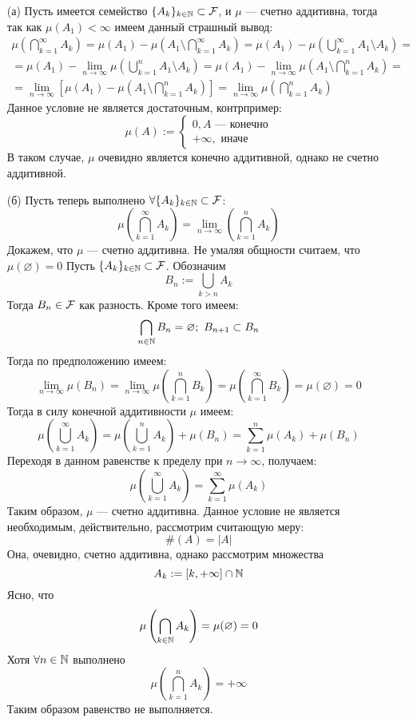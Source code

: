\begin{solution}
	\begin{enumerate}
		\item[(а)] Пусть имеется семейство $\{A_k\}_{k\in \mathbb{N}} \subset \mathcal{F} $, и $\mu$ --- счетно аддитивна, тогда так как $\mu(A_1) < \infty$ имеем данный страшный вывод:
		\begin{multline*}
				\mu\left(\bigcap_{k=1}^{\infty}A_k\right) = \mu(A_1) - \mu\left(A_1 \setminus \bigcap_{k=1}^{\infty}A_k\right) = \mu(A_1) - \mu\left(\bigcup_{k=1}^{\infty}A_1 \setminus A_k \right) = \\ = \mu(A_1) - \lim\limits_{n \rightarrow \infty}\mu \left(\bigcup_{k=1}^{n}A_1 \setminus A_k\right)  = \mu(A_1) - \lim\limits_{n \rightarrow \infty}\mu\left(A_1 \setminus \bigcap_{k=1}^{n}A_k\right) = \\ = \lim\limits_{n \rightarrow \infty} \left[ \mu(A_1) - \mu\left( A_1 \setminus \bigcap_{k=1}^{n}A_k\right) \right] = \lim\limits_{n \rightarrow \infty}\mu\left(\bigcap_{k=1}^{n}A_k\right)
		\end{multline*}
	Данное условие не является достаточным, контрпример:
	$$
	\mu(A) := 
	\begin{cases}
		0, A\text{ --- конечно}  \\
		+\infty,\text{ иначе}
	\end{cases}
	$$
	В таком случае, $\mu$ очевидно является конечно аддитивной, однако не счетно аддитивной.
	\item[(б)]
	 Пусть теперь выполнено $\forall \{A_k\}_{k \in \mathbb{N}} \subset \mathcal{F} $: 
	 $$
	 \mu\left(\bigcap_{k=1}^{\infty}A_k\right) = \lim\limits_{n \rightarrow \infty} \left(\bigcap_{k=1}^{n}A_k\right)
	 $$
	 Докажем, что $\mu$ --- счетно аддитивна. Не умаляя общности считаем, что $\mu(\varnothing) = 0$
	 Пусть $\{A_k\}_{k \in \mathbb{N}} \subset \mathcal{F} $. Обозначим 
	 $$
	 B_n := \bigcup_{k>n} A_k
	 $$
	 Тогда $B_n \in \mathcal{F} $ как разность. Кроме того имеем:
	 $$
	 \bigcap_{n \in \mathbb{N}} B_n = \varnothing; ~ B_{n+1} \subset B_n
	 $$
	 Тогда по предположению имеем:
	 $$
	 \lim\limits_{n \rightarrow \infty} \mu\left(B_n\right) = \lim\limits_{n \rightarrow \infty}\mu\left(\bigcap_{k=1}^nB_k\right) = \mu\left(\bigcap_{k=1}^{\infty}B_k \right) = \mu(\varnothing) = 0
	 $$
	 Тогда в силу конечной аддитивности $\mu$ имеем:
	 $$
	 \mu\left(\bigcup_{k=1}^{\infty}A_k\right) = \mu\left(\bigcup_{k=1}^n A_k \right) + \mu\left(B_n\right) = \sum_{k=1}^n\mu(A_k) + \mu(B_n)
	 $$
	 Переходя в данном равенстве к пределу при $n \rightarrow \infty$, получаем:
	 $$
	 \mu\left(\bigcup_{k=1}^{\infty}A_k\right) = \sum_{k=1}^{\infty}\mu(A_k)
	 $$
	 Таким образом, $\mu$ --- счетно аддитивна.
	 Данное условие не является необходимым, действительно, рассмотрим считающую меру:
	 $$
	 \#(A) = |A|
	 $$
	 Она, очевидно, счетно аддитивна, однако рассмотрим множества 
	 $$
	 A_k := [k, +\infty] \cap \mathbb{N}
	 $$
	 Ясно, что 
	 $$
	 \mu\left(\bigcap_{k\in \mathbb{N}} A_k\right) = \mu(\varnothing) = 0
	 $$
	 Хотя $\forall n \in \mathbb{N}$ выполнено
	 $$
	 \mu\left(\bigcap_{k=1}^n A_k\right) = +\infty
	 $$
	 Таким образом равенство не выполняется.
	\end{enumerate}
\end{solution}